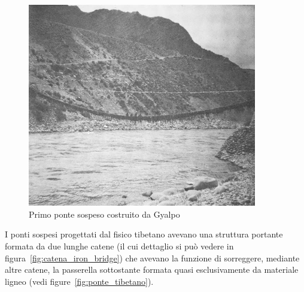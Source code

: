 \begin{figure}
	\centering
	\includegraphics[width=10cm]{Immagini/Iron_Bridge_01}
	\caption{Primo ponte sospeso costruito da Gyalpo}
	\label{fig:first_iron_bridge}
\end{figure}

I ponti sospesi progettati dal fisico tibetano avevano una struttura portante formata da due lunghe catene (il cui dettaglio si può vedere in figura~\ref{fig:catena_iron_bridge}) che avevano la funzione di sorreggere, mediante altre catene, la passerella sottostante formata quasi esclusivamente da materiale ligneo (vedi figure~\ref{fig:ponte_tibetano}).

